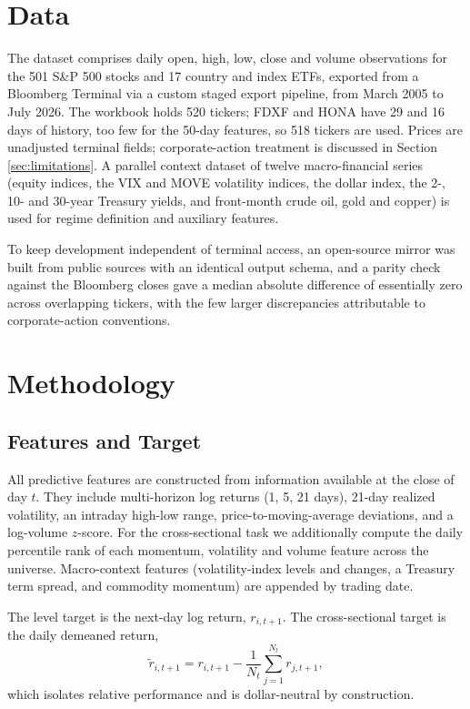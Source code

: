 \documentclass[conference]{IEEEtran}
\begin{document}
\section{Data}
The dataset comprises daily open, high, low, close and volume observations for the
501 S\&P 500 stocks and 17 country and index ETFs, exported from a Bloomberg Terminal via a custom staged export pipeline, from March 2005 to July 2026. The workbook holds 520 tickers; FDXF and HONA have 29 and 16 days of history, too few for the 50-day features, so 518 tickers are used. Prices are
unadjusted terminal fields; corporate-action treatment is discussed in Section
\ref{sec:limitations}. A parallel context dataset of twelve macro-financial series
(equity indices, the VIX and MOVE volatility indices, the dollar index, the 2-,
10- and 30-year Treasury yields, and front-month crude oil, gold and copper) is
used for regime definition and auxiliary features.

To keep development independent of terminal access, an open-source mirror was
built from public sources with an identical output schema, and a parity check
against the Bloomberg closes gave a median absolute difference of essentially zero
across overlapping tickers, with the few larger discrepancies attributable to
corporate-action conventions.

\section{Methodology}

\subsection{Features and Target}
All predictive features are constructed from information available at the close of
day $t$. They include multi-horizon log returns (1, 5, 21 days), 21-day realized
volatility, an intraday high-low range, price-to-moving-average deviations, and a
log-volume $z$-score. For the cross-sectional task we additionally compute the
daily percentile rank of each momentum, volatility and volume feature across the
universe. Macro-context features (volatility-index levels and changes, a Treasury
term spread, and commodity momentum) are appended by trading date.

The level target is the next-day log return, $r_{i,t+1}$. The cross-sectional
target is the daily demeaned return,
\begin{equation}
\tilde{r}_{i,t+1} = r_{i,t+1} - \frac{1}{N_t}\sum_{j=1}^{N_t} r_{j,t+1},
\end{equation}
which isolates relative performance and is dollar-neutral by construction.
\end{document}
